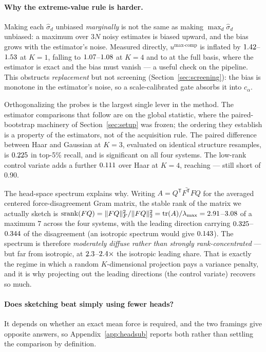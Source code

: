 \documentclass{article}
\begin{document}
\paragraph{Why the extreme-value rule is harder.}
Making each $\widehat\sigma_d$ unbiased \emph{marginally} is not the same as making
$\max_d\widehat\sigma_d$ unbiased: a maximum over $3N$ noisy estimates is biased upward, and the
bias grows with the estimator's noise. Measured directly, $u^{\max\text{-comp}}$ is inflated by
$1.42$--$1.53$ at $K{=}1$, falling to
$1.07$--$1.08$ at $K{=}4$ and to \fsMaxBiasExact{} at the full basis,
where the estimator is exact and the bias must vanish --- a useful check on the pipeline. This
obstructs \emph{replacement} but not screening (Section~\ref{sec:screening}): the bias is monotone
in the estimator's noise, so a scale-calibrated gate absorbs it into $c_\alpha$.

Orthogonalizing the probes is the largest single lever in the method. The estimator comparisons that
follow are on the global statistic, where the paired-bootstrap machinery of Section~\ref{sec:setup}
was frozen; the ordering they establish is a property of the estimators, not of the acquisition rule.
The paired difference between Haar and Gaussian at $K{=}3$, evaluated on identical structure
resamples, is
$0.225$ \fsDeltaOrthoCI{} in top-5\% recall, and is significant on all four systems. The
low-rank control variate adds a further $0.111$ \fsDeltaCVCI{} over Haar at $K{=}4$, reaching
\fsCVRecallKFour{} \fsCVRecallKFourCI{} --- still short of 0.90.

The head-space spectrum explains why. Writing $A=\bar{Q^{\mathsf T}F^{\mathsf T}FQ}$ for the averaged
centered force-disagreement Gram matrix, the stable rank of the matrix we actually sketch is
$\operatorname{srank}(FQ)=\|FQ\|_F^2/\|FQ\|_2^2=\operatorname{tr}(A)/\lambda_{\max}
=2.91$--$3.08$ of a maximum $7$ across the four systems, with the leading direction
carrying $0.325$--$0.344$ of the disagreement (an isotropic spectrum would give
$0.143$). The spectrum is therefore \emph{moderately diffuse rather than strongly
rank-concentrated} --- but far from isotropic, at
$2.3$--$2.4\times$ the isotropic leading share.
That is exactly the regime in which a random $K$-dimensional projection pays a variance penalty, and
it is why projecting out the leading directions (the control variate) recovers so much.


\paragraph{Does sketching beat simply using fewer heads?} It depends on whether an exact mean force
is required, and the two framings give opposite answers, so Appendix~\ref{app:headsub} reports both
rather than settling the comparison by definition.
\end{document}
